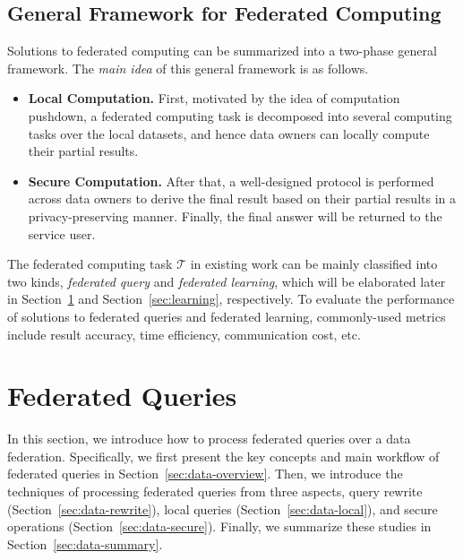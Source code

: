 \documentclass[11pt]{article}
\newcommand{\etc}{etc.\xspace}
\newcommand\secref[1]{Section~\ref{#1}}
\newcommand{\T}{\mathcal{T}}
\begin{document}
\subsection{General Framework for Federated Computing}\label{sec:concept-framework}

Solutions to federated computing can be summarized into a two-phase general framework. The \textit{main idea} of this general framework is as follows.
\begin{itemize}
	\item \textbf{Local Computation.} First, motivated by the idea of computation pushdown, a federated computing task is decomposed into several computing tasks over the local datasets, and hence data owners can locally compute their partial results.
	\item \textbf{Secure Computation.} After that, a well-designed protocol is performed across data owners to derive the final result based on their partial results in a privacy-preserving manner. Finally, the final answer will be returned to the service user. 
\end{itemize}

The federated computing task $\T$ in existing work can be mainly classified into two kinds, \textit{federated query} and \textit{federated learning}, which will be elaborated later in \secref{sec:data} and \secref{sec:learning}, respectively. 
To evaluate the performance of solutions to federated queries and federated learning, commonly-used metrics include result accuracy, time efficiency, communication cost, \etc

\newcommand{\SMCQL}{\textsf{SMCQL}\xspace}
\newcommand{\SAQE}{\textsf{SAQE}\xspace}
\newcommand{\Shrinkwrap}{\textsf{ShrinkWrap}\xspace}
\newcommand{\HuFu}{\textsf{Hu-Fu}\xspace}
\newcommand{\Conclave}{\textsf{Conclave}\xspace}
\newcommand{\Senate}{\textsf{Senate}\xspace}
\newcommand{\Opaque}{\textsf{Opaque}\xspace}

\section{Federated Queries}\label{sec:data}

In this section, we introduce how to process federated queries over a data federation.
Specifically, we first present the key concepts and main workflow of federated queries in \secref{sec:data-overview}.
Then, we introduce the techniques of processing federated queries from three aspects,
query rewrite (\secref{sec:data-rewrite}), local queries (\secref{sec:data-local}), and secure operations (\secref{sec:data-secure}).
Finally, we summarize these studies in \secref{sec:data-summary}.
\end{document}
